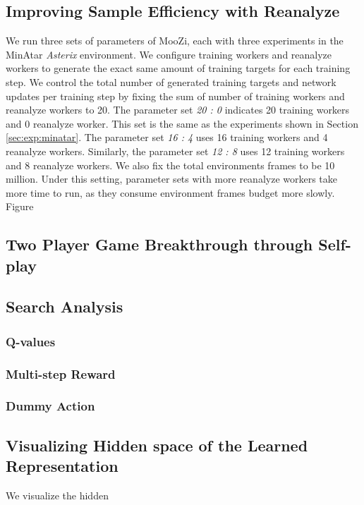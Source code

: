\subsection{Improving Sample Efficiency with Reanalyze} \label{sec:exp:re}
We run three sets of parameters of MooZi, each with three experiments in the MinAtar \textit{Asterix} environment.
We configure training workers and reanalyze workers to generate the exact same amount of training targets for each training step.
We control the total number of generated training targets and network updates per training step by fixing the sum of number of training workers and reanalyze workers to 20.
The parameter set \textit{20 : 0} indicates 20 training workers and 0 reanalyze worker.
This set is the same as the experiments shown in Section \ref{sec:exp:minatar}.
The parameter set \textit{16 : 4} uses 16 training workers and 4 reanalyze workers.
Similarly, the parameter set \textit{12 : 8} uses 12 training workers and 8 reanalyze workers.
We also fix the total environments frames to be 10 million.
Under this setting, parameter sets with more reanalyze workers take more time to run, as they consume environment frames budget more slowly.
Figure 

\subsection{Two Player Game Breakthrough through Self-play}
\subsection{Search Analysis}
\subsubsection{Q-values}
\subsubsection{Multi-step Reward}
\subsubsection{Dummy Action}

\subsection{Visualizing Hidden space of the Learned Representation}
We visualize the hidden 

\subsubsection{}
